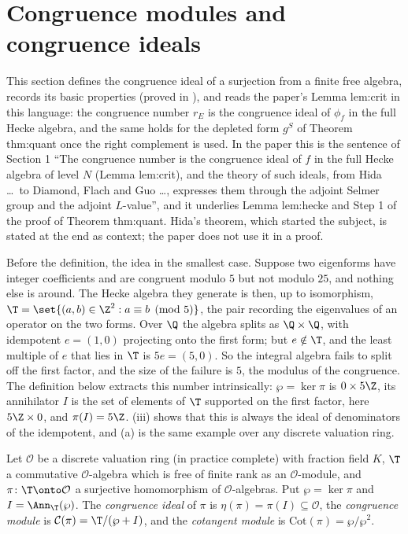 \section{Congruence modules and congruence ideals}\label{sec:congruence:modules}

This section defines the congruence ideal of a surjection from a finite free algebra, records its basic properties (proved in ),
and reads the paper's Lemma lem:crit in this language: the congruence number $r_E$ is the congruence ideal of $\phi_f$ in the full Hecke algebra, and
the same holds for the depleted form $g^S$ of Theorem thm:quant once the right complement is used. In the paper this is the sentence of Section 1
``The congruence number is the congruence ideal of $f$ in the full Hecke algebra of level $N$ (Lemma lem:crit), and the theory of such ideals, from Hida \dots\ to
Diamond, Flach and Guo \dots, expresses them through the adjoint Selmer group and the adjoint $L$-value'', and it underlies Lemma lem:hecke and Step 1 of the proof
of Theorem thm:quant. Hida's theorem, which started the subject, is stated at the end as context; the paper does not use it in a proof.

Before the definition, the idea in the smallest case. Suppose two eigenforms have integer coefficients and are congruent modulo $5$ but not modulo $25$, and nothing else is around. The Hecke
algebra they generate is then, up to isomorphism, $\T=\set{(a,b)\in\Z^2:a\equiv b\pmod5}$, the pair recording the eigenvalues of an operator on the two forms. Over $\Q$ the algebra splits as
$\Q\times\Q$, with idempotent $e=(1,0)$ projecting onto the first form; but $e\notin\T$, and the least multiple of $e$ that lies in $\T$ is $5e=(5,0)$. So the integral algebra fails to split off the
first factor, and the size of the failure is $5$, the modulus of the congruence. The definition below extracts this number intrinsically: $\wp=\ker\pi$ is $0\times5\Z$, its annihilator $I$ is the set
of elements of $\T$ supported on the first factor, here $5\Z\times0$, and $\pi(I)=5\Z$. (iii) shows that this is always the ideal of denominators of the
idempotent, and (a) is the same example over any discrete valuation ring.

\begin{definition}\label{def:congruence:congruence-module}
Let $\mathcal O$ be a discrete valuation ring (in practice complete) with fraction field $K$, $\T$ a commutative $\mathcal O$-algebra which is free of finite rank as an $\mathcal O$-module, and
$\pi\colon\T\onto\mathcal O$ a surjective homomorphism of $\mathcal O$-algebras. Put $\wp=\ker\pi$ and $I=\Ann_\T(\wp)$. The \emph{congruence ideal} of $\pi$ is $\eta(\pi)=\pi(I)\subseteq\mathcal O$, the
\emph{congruence module} is $\mathcal C(\pi)=\T/(\wp+I)$, and the \emph{cotangent module} is $\mathrm{Cot}(\pi)=\wp/\wp^2$.
\end{definition}


